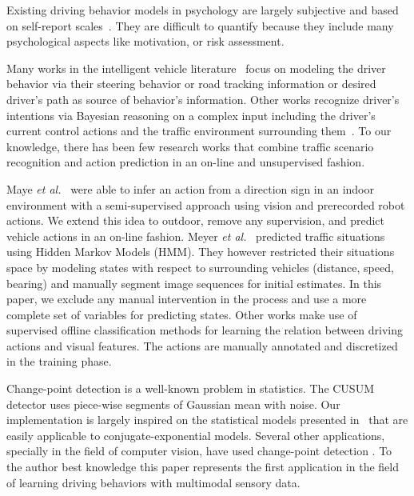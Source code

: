 Existing driving behavior models in psychology are largely subjective and based
on self-report scales~\cite{ranney94models}. They are difficult to quantify
because they include many psychological aspects like motivation, or risk
assessment.

Many works in the intelligent vehicle
literature~\cite{donges78two,mcruer80human,hess90control,macadam81application}
focus on modeling the driver behavior via their steering behavior or road
tracking information or desired driver's path as source of behavior's
information. Other works recognize driver's intentions via Bayesian reasoning on
a complex input including the driver's current control actions and the traffic
environment surrounding them~\cite{oliver00graphical,liu01modeling}. To our
knowledge, there has been few research works that combine traffic scenario
recognition and action prediction in an on-line and unsupervised fashion.

Maye \emph{et al.}~\cite{maye10inferring} were able to infer an action from a
direction sign in an indoor environment with a semi-supervised approach
using vision and prerecorded robot actions. We extend this idea to outdoor,
remove any supervision, and predict vehicle actions in an on-line fashion.
Meyer \emph{et al.}~\cite{meyer09probabilistic} predicted traffic situations
using Hidden Markov Models (HMM). They however restricted their situations space
by modeling states with respect to surrounding vehicles (distance, speed,
bearing) and manually segment image sequences for initial estimates. In this
paper, we exclude any manual intervention in the process and use a more complete
set of variables for predicting states.
Other works  \cite{heracles10vision,pugeault10learning} make use of supervised 
offline classification methods for learning the relation between driving actions and 
visual features. The actions are manually annotated and discretized in the training phase.

Change-point detection is a well-known problem in statistics. The CUSUM detector
\cite{page54continuous} uses piece-wise segments of Gaussian mean with noise.
Our implementation is largely inspired on the statistical models presented
in~\cite{adams07bayesian,fearnhead07online} that are easily applicable to
conjugate-exponential models. Several other applications, specially in the field
of computer vision, have used change-point detection
\cite{zhai05general,cemgil05hybrid}. To the author best knowledge this paper
represents the first application in the field of learning driving behaviors 
with multimodal sensory data.
